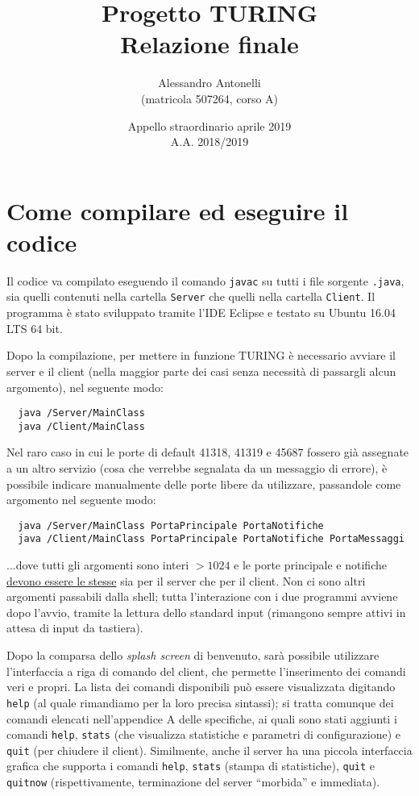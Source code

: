 \documentclass[a4paper,12pt]{article}
\title { \vspace{-4.0cm}{\small Università di Pisa\\Laboratorio di Reti di calcolatori (274AA)\\[0.7cm]}Progetto TURING\\Relazione finale }
\author { Alessandro Antonelli\\(matricola 507264, corso A) }
\date { Appello straordinario aprile 2019\\A.A. 2018/2019 }
\begin{document}
 \maketitle
 
 \tableofcontents
 \clearpage
 

 \section{ Come compilare ed eseguire il codice }
 
 Il codice va compilato eseguendo il comando \texttt{javac} su tutti i file sorgente \texttt{.java}, sia quelli contenuti nella cartella \texttt{Server} che quelli nella cartella \texttt{Client}. Il programma è stato sviluppato tramite l'IDE Eclipse e testato su Ubuntu 16.04 LTS 64 bit.
 
 Dopo la compilazione, per mettere in funzione TURING è necessario avviare il server e il client (nella maggior parte dei casi senza necessità di passargli alcun argomento), nel seguente modo:
 
 \begin{verbatim}
  java /Server/MainClass
  java /Client/MainClass
 \end{verbatim}
 
 Nel raro caso in cui le porte di default 41318, 41319 e 45687 fossero già assegnate a un altro servizio (cosa che verrebbe segnalata da un messaggio di errore), è possibile indicare manualmente delle porte libere da utilizzare, passandole come argomento nel seguente modo:

  \begin{verbatim}
  java /Server/MainClass PortaPrincipale PortaNotifiche
  java /Client/MainClass PortaPrincipale PortaNotifiche PortaMessaggi
 \end{verbatim}
 
 ...dove tutti gli argomenti sono interi $> 1024$ e le porte principale e notifiche \underline{devono essere le stesse} sia per il server che per il client. Non ci sono altri argomenti passabili dalla shell; tutta l'interazione con i due programmi avviene dopo l'avvio, tramite la lettura dello standard input (rimangono sempre attivi in attesa di input da tastiera).
 
 Dopo la comparsa dello \textit{splash screen} di benvenuto, sarà possibile utilizzare l'interfaccia a riga di comando del client, che permette l'inserimento dei comandi veri e propri. La lista dei comandi disponibili può essere visualizzata digitando \texttt{help} (al quale rimandiamo per la loro precisa sintassi); si tratta comunque dei comandi elencati nell'appendice A delle specifiche, ai quali sono stati aggiunti i comandi \texttt{help}, \texttt{stats} (che visualizza statistiche e parametri di configurazione) e \texttt{quit} (per chiudere il client). Similmente, anche il server ha una piccola interfaccia grafica che supporta i comandi \texttt{help}, \texttt{stats} (stampa di statistiche), \texttt{quit} e \texttt{quitnow} (rispettivamente, terminazione del server ``morbida'' e immediata).
 
\end{document}
